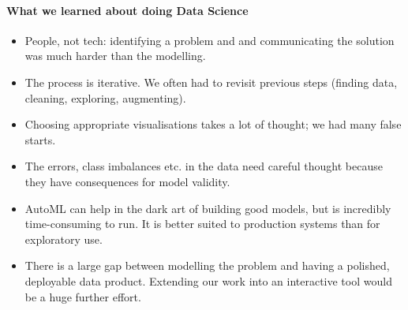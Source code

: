 \paragraph{What we learned about doing Data Science}
\vspace{-0.5em}
\begin{itemize}
    \item People, not tech: identifying a problem and 
    and communicating the solution was much harder than the modelling. \vspace{-0.25em}
    \item The process is iterative. We often had to revisit previous steps (finding data, cleaning, exploring, augmenting).\vspace{-0.25em}
    \item Choosing appropriate visualisations takes a lot of thought; we had many false starts.\vspace{-0.25em}
    \item The errors, class imbalances etc. in the data need careful thought because they have consequences for model validity.\vspace{-0.25em}
    \item AutoML can help in the dark art of building good models, but is incredibly time-consuming to run. It is better
    suited to production systems than for exploratory use.\vspace{-0.25em}
    \item There is a large gap between modelling the problem and
    having a polished, deployable data product. Extending our work into an interactive tool would be a huge further effort.
\end{itemize}